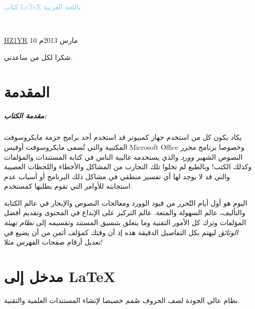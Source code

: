 \documentclass[12pt,a4paper,onecolumn,notitlepage]{book}
\providecommand{\HUGE}{\Huge}%
\newlength{\drop}%
\newcommand*{\titleLL}{\begingroup%
\drop=0.1\textheight
\fboxsep 0.5\baselineskip
\sffamily
\vspace*{\drop}
\centering
{\textcolor{SkyBlue}{\HUGE كتاب \textenglish{\LaTeX} باللغة العربية}}\par
\vspace{0.5\drop}
\colorbox{Dark}{\textcolor{white}{\normalfont\itshape\Large
تأليف: يُوسُف عَدنَان رَفـَّــه}}\par
\vspace{\drop}
{\Large {\href{http://www.HZ1YR.com}{\textenglish{HZ1YR}}}}
\vfill
{\footnotesize{10 مارس 2013م}}\par
\vspace*{\drop}
\endgroup}
\newenvironment{dedication}
{
\cleardoublepage
\vspace*{\stretch{1}}
\hfill\begin{minipage}[t]{0.66\textwidth}
\raggedleft
}%
{
\end{minipage}
\vspace*{\stretch{3}}
\begin{center}
\color{slategray2}
{\Huge\decoone}
\end{center}
}
\begin{document}

\titleLL
\begin{center}
	\color{slategray2VeryLight}
	{\Huge\decoone}
\end{center}

\begin{dedication}
	{\Huge{}}
	\vspace{14pt}
		شكرا لكل من ساعدني.
\end{dedication}

\tableofcontents
{}
	
	
\pagestyle{fancy}
\chapter*{المقدمة}
\paragraph{مقدمة الكتاب:} %
\label{par:مقدمة}
يكاد يكون كل من استخدم جهاز كمبيوتر قد استخدم أحد برامج حزمة مايكروسوفت المكتبية والتي تُسمى مايكروسوفت أوفيس \textenglish{Microsoft Office} وخصوصا برنامج محرر النصوص الشهير \emph{وورد} والذي يستخدمه غالبية الناس في كتابة المستندات والمؤلفات وكذلك الكتب! وبالطبع لم تخلوا تلك التجارب من المشاكل والأخطاء واللحظات العصيبة والتي قد لا يوجد لها أي تفسير منطقي في مشاكل ذلك البرنامج أو أسباب عدم استجابته للأوامر التي تقوم بطلبها كمستخدم.

اليوم هو أول أيام التّحرر من قيود الوورد ومعالجات النصوص والإبحار في عالم الكتابة والتأليف، عالم السهولة والمتعة. عالم التركيز على الإبداع في المحتوى وتقديم أفضل المؤلفات وترك كل الأمور التقنية وما يتعلق بتنسيق المستند وتقسيمه إلى \emph{نظام تهيئة الوثائق} ليهتم بكل التفاصيل الدقيقة هذه إذ أن وقتك كمؤلف أثمن من أن يضيع في تعديل أرقام صفحات الفهرس مثلا!

\chapter{مدخل إلى \textenglish{\LaTeX}}
نظام عالي الجودة لصف الحروف صُمم خصيصا لإنشاء المستندات العلمية والتقنية.
\end{document}
